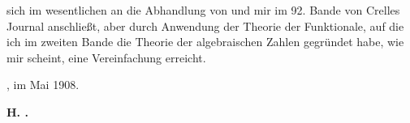 sich im wesentlichen an die Abhandlung von  und mir im 92. Bande von Crelles Journal anschließt, aber durch Anwendung der Theorie der Funktionale, auf die ich im zweiten Bande die Theorie der algebraischen Zahlen gegründet habe, wie mir scheint, eine Vereinfachung erreicht.

\bigskip
{}, im Mai 1908.

\begin{flushright}
\textbf{H. .}
\end{flushright}
